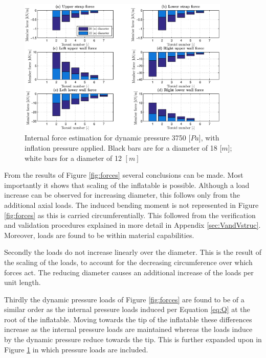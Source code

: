 \begin{figure}[h]
	\centering
	\includegraphics[width=0.9\textwidth]{./Figure/Structure/forces_test.eps}
	\caption[{Internal force estimation for dynamic pressure 3750 [$Pa$], with inflation pressure applied}]{Internal force estimation for dynamic pressure 3750 [$Pa$], with inflation pressure applied. Black bars are for a diameter of 18 [$m$]; white bars for a diameter of 12 $[m]$}
	\label{fig:forcesp}
\end{figure}

From the results of Figure \ref{fig:forces} several conclusions can be made. Most importantly it shows that scaling of the inflatable is possible. Although a load increase can be observed for increasing diameter, this follows only from the additional axial loads. The induced bending moment is not represented in Figure \ref{fig:forces} as this is carried circumferentially. This followed from the verification and validation procedures explained in more detail in Appendix \ref{sec:VandVstruc}. Moreover, loads are found to be within material capabilities.

Secondly the loads do not increase linearly over the diameter. This is the result of the scaling of the loads, to account for the decreasing circumference over which forces act. The reducing diameter causes an additional increase of the loads per unit length.

Thirdly the dynamic pressure loads of Figure \ref{fig:forces} are found to be of a similar order as the internal pressure loads induced per Equation \ref{eq:Q} at the root of the inflatable. Moving towards the tip of the inflatable these differences increase as the internal pressure loads are maintained whereas the loads induce by the dynamic pressure reduce towards the tip. This is further expanded upon in Figure \ref{fig:forcesp} in which pressure loads are included.

